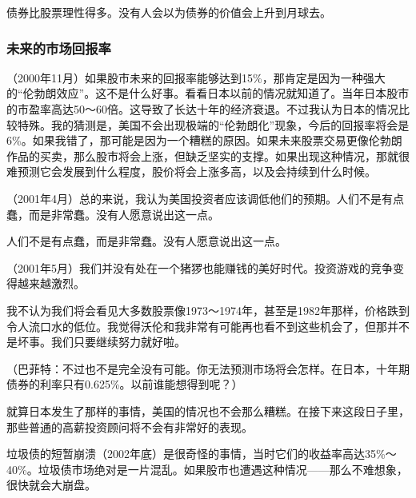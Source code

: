 债券比股票理性得多。没有人会以为债券的价值会上升到月球去。
\par

\subsubsection*{未来的市场回报率}

（2000年11月）如果股市未来的回报率能够达到15\%，那肯定是因为一种强大的“伦勃朗效应”。这不是什么好事。看看日本以前的情况就知道了。当年日本股市的市盈率高达50～60倍。这导致了长达十年的经济衰退。不过我认为日本的情况比较特殊。我的猜测是，美国不会出现极端的“伦勃朗化”现象，今后的回报率将会是6\%。如果我错了，那可能是因为一个糟糕的原因。如果未来股票交易更像伦勃朗作品的买卖，那么股市将会上涨，但缺乏坚实的支撑。如果出现这种情况，那就很难预测它会发展到什么程度，股价将会上涨多高，以及会持续到什么时候。
\par

（2001年4月）总的来说，我认为美国投资者应该调低他们的预期。人们不是有点蠢，而是非常蠢。没有人愿意说出这一点。
\par

\begin{WisdomBox}
\par

人们不是有点蠢，而是非常蠢。没有人愿意说出这一点。
\par
\end{WisdomBox}

（2001年5月）我们并没有处在一个猪猡也能赚钱的美好时代。投资游戏的竞争变得越来越激烈。
\par

我不认为我们将会看见大多数股票像1973～1974年，甚至是1982年那样，价格跌到令人流口水的低位。我觉得沃伦和我非常有可能再也看不到这些机会了，但那并不是坏事。我们只要继续努力就好啦。
\par

（巴菲特：不过也不是完全没有可能。你无法预测市场将会怎样。在日本，十年期债券的利率只有0.625\%。以前谁能想得到呢？）
\par

就算日本发生了那样的事情，美国的情况也不会那么糟糕。在接下来这段日子里，那些普通的高薪投资顾问将不会有非常好的表现。
\par

垃圾债的短暂崩溃（2002年底）是很奇怪的事情，当时它们的收益率高达35\%～40\%。垃圾债市场绝对是一片混乱。如果股市也遭遇这种情况——那么不难想象，很快就会大崩盘。
\par

